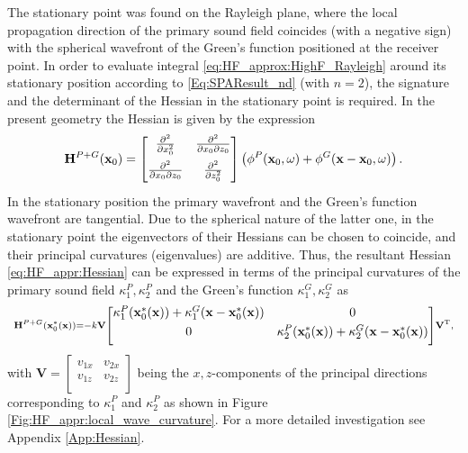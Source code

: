 The stationary point was found on the Rayleigh plane, where the local propagation direction of the primary sound field coincides (with a negative sign) with the spherical wavefront of the Green's function positioned at the receiver point. 
In order to evaluate integral \eqref{eq:HF_approx:HighF_Rayleigh} around its stationary position according to \eqref{Eq:SPAResult_nd} (with $n=2$), the signature and the determinant of the Hessian in the stationary point is required.
In the present geometry the Hessian is given by the expression
\begin{equation}
\mathbf{H}^{P+G}(\mathbf{x}_0) =
\begin{bmatrix} 
\frac{\partial^2}{\partial x_0^2} & \frac{\partial^2}{\partial x_0 \partial z_0} \\[.7em]
\frac{\partial^2}{\partial x_0 \partial z_0} & \frac{\partial^2}{\partial z_0^2}\\[0.5em] \end{bmatrix} 
\left( \phi^P(\mathbf{x}_0,\omega) + \phi^G(\mathbf{x}-\mathbf{x}_0,\omega)  \right).
\label{eq:HF_appr:Hessian}
\end{equation}
In the stationary position the primary wavefront and the Green's function wavefront are tangential.
Due to the spherical nature of the latter one, in the stationary point the eigenvectors of their Hessians can be chosen to coincide, and their principal curvatures (eigenvalues) are additive.
Thus, the resultant Hessian \eqref{eq:HF_appr:Hessian} can be expressed in terms of the principal curvatures of the primary sound field $\kappa_1^P, \kappa_2^P$ and the Green's function $\kappa_1^G, \kappa_2^G$ as
\begin{equation}
\scriptstyle
\mathbf{H}^{P+G}(\mathbf{x}_0^*(\mathbf{x})) = -k
\mathbf{V}
\begin{bmatrix} 
\kappa_1^P(\mathbf{x}_0^*(\mathbf{x})) + \kappa_1^G(\mathbf{x}-\mathbf{x}_0^*(\mathbf{x})) & 0 \\[.3em]
0 & \kappa_2^P(\mathbf{x}_0^*(\mathbf{x})) + \kappa_2^G(\mathbf{x}-\mathbf{x}_0^*(\mathbf{x})) \\[.5em] \end{bmatrix}
\mathbf{V}^{\mathrm{T}},
\end{equation}
with $\scriptstyle \mathbf{V} = \begin{bmatrix} 
v_{1 x} & v_{2 x} \\[.1em]
v_{1 z} & v_{2 z}\\[.3em] \end{bmatrix}$ being the $x,z$-components of the principal directions corresponding to $\kappa_1^P$ and $\kappa_2^P$ as shown in Figure \ref{Fig:HF_appr:local_wave_curvature}.
For a more detailed investigation see Appendix \ref{App:Hessian}.
